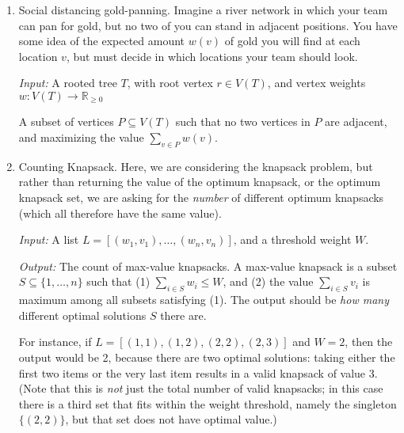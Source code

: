 \documentclass[12pt]{article}
\begin{document}
\begin{enumerate}
\begin{enumerate}
\item \label{2a} Social distancing gold-panning. Imagine a river network in which your team can pan for gold, but no two of you can stand in adjacent positions. You have some idea of the expected amount $w(v)$ of gold you will find at each location $v$, but must decide in which locations your team should look.

\textit{Input:} A rooted tree $T$, with root vertex $r \in V(T)$, and vertex weights $w\colon V(T) \to \mathbb{R}_{\geq 0}$

 A subset of vertices $P \subseteq V(T)$ such that no two vertices in $P$ are adjacent, and maximizing the value $\sum_{v \in P} w(v)$.

\pagebreak

\item \label{2b} Counting Knapsack. Here, we are considering the knapsack problem, but rather than returning the value of the optimum knapsack, or the optimum knapsack set, we are asking for the \emph{number} of different optimum knapsacks (which all therefore have the same value).

\textit{Input:} A list $L = [(w_1, v_1), \dotsc, (w_n, v_n)]$, and a threshold weight $W$.

\textit{Output:} The count of max-value knapsacks. A max-value knapsack is a subset $S \subseteq \{1,\dotsc,n\}$ such that (1) $\sum_{i \in S} w_i \leq W$, and (2) the value $\sum_{i \in S} v_i$ is maximum among all subsets satisfying (1). The output should be \emph{how many} different optimal solutions $S$ there are.

For instance, if $L = [(1,1), (1,2), (2,2), (2,3)]$ and $W = 2$, then the output would be 2, because there are two optimal solutions: taking either the first two items or the very last item results in a valid knapsack of value 3. (Note that this is \emph{not} just the total number of valid knapsacks; in this case there is a third set that fits within the weight threshold, namely the singleton $\{(2,2)\}$, but that set does not have optimal value.)

\pagebreak


\end{enumerate}


\end{enumerate}
\end{document}
